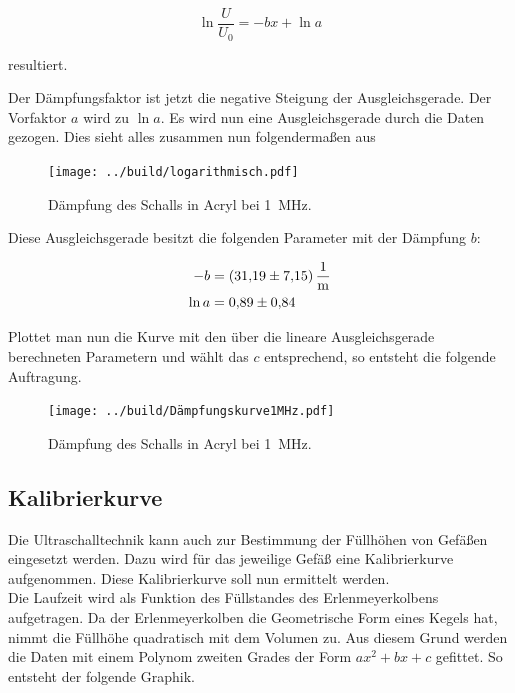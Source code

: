 \begin{equation*}
    \ln{\frac{U}{U_0}} = {-bx} + \ln{a}
\end{equation*}

\noindent resultiert.

\noindent Der Dämpfungsfaktor ist jetzt die negative Steigung der Ausgleichsgerade. Der Vorfaktor $a$ wird 
zu $\ln{a}$. Es wird nun eine Ausgleichsgerade durch die Daten gezogen. Dies sieht alles zusammen nun folgendermaßen aus

\begin{figure}[H]
    \centering
    \texttt{[image: ../build/logarithmisch.pdf]}
    \caption{Dämpfung des Schalls in Acryl bei \qty{1}{\mega\hertz}.}
\end{figure}

\noindent Diese Ausgleichsgerade besitzt die folgenden Parameter mit der Dämpfung $b$:

\begin{align*}
    -b &= \qty{31.19\pm7.15}{\per \meter} \\
    \ln{a} &= \num{0.89\pm0.84} \\
\end{align*}

\noindent Plottet man nun die Kurve mit den über die lineare Ausgleichsgerade berechneten Parametern und wählt das $c$ entsprechend, 
so entsteht die folgende Auftragung.

\begin{figure}[H]
    \centering
    \texttt{[image: ../build/Dämpfungskurve1MHz.pdf]}
    \caption{Dämpfung des Schalls in Acryl bei \qty{1}{\mega\hertz}.}
\end{figure}



\subsection{Kalibrierkurve}
Die Ultraschalltechnik kann auch zur Bestimmung der Füllhöhen von Gefäßen eingesetzt werden. Dazu wird für das jeweilige Gefäß 
eine Kalibrierkurve aufgenommen. Diese Kalibrierkurve soll nun ermittelt werden. \\
\noindent Die Laufzeit wird als Funktion des Füllstandes des Erlenmeyerkolbens aufgetragen. Da der Erlenmeyerkolben 
die Geometrische Form eines Kegels hat, nimmt die Füllhöhe quadratisch mit dem Volumen zu. Aus diesem Grund werden die Daten 
mit einem Polynom zweiten Grades der Form $ax^2 +bx +c$ gefittet. So entsteht der folgende Graphik.

